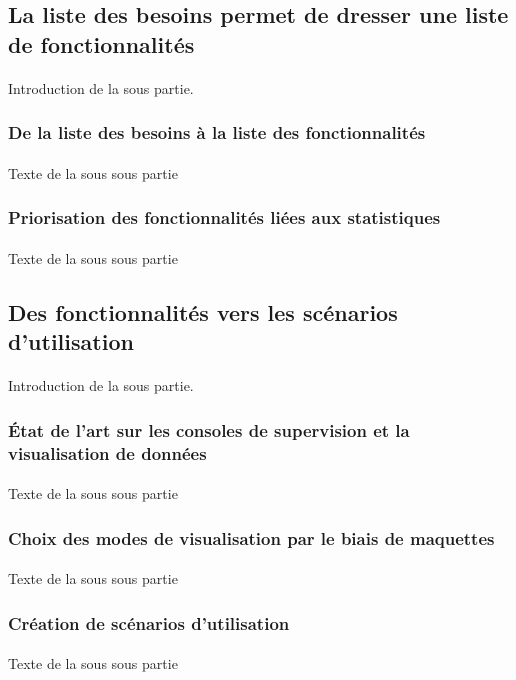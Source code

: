 	\subsection{La liste des besoins permet de dresser une liste de fonctionnalités}
		\paragraph{}
		Introduction de la sous partie.
		
		\subsubsection{De la liste des besoins à la liste des fonctionnalités}
			\paragraph{}
			Texte de la sous sous partie
		\subsubsection{Priorisation des fonctionnalités liées aux statistiques}
			\paragraph{}
			Texte de la sous sous partie
	
	\subsection{Des fonctionnalités vers les scénarios d'utilisation}
		\paragraph{}
		Introduction de la sous partie.
		
		\subsubsection{État de l'art sur les consoles de supervision et la visualisation de données}
			\paragraph{}
			Texte de la sous sous partie
		\subsubsection{Choix des modes de visualisation par le biais de maquettes}
			\paragraph{}
			Texte de la sous sous partie
		\subsubsection{Création de scénarios d'utilisation}
			\paragraph{}
			Texte de la sous sous partie
